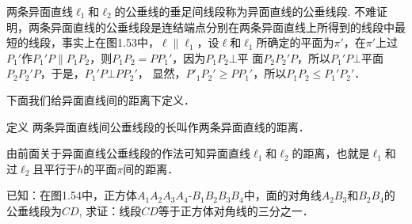   两条异面直线$\ell_1$和$\ell_2$的公垂线的垂足间线段称为异面直线的公垂线段. 不难证明，两条异面直线的公垂线段是连结端点分别在两条异面直线上所得到的线段中最短的线段，事实上在图1.53中，$\ell\parallel \ell_1$，设$\ell$和$\ell_1$所确定的平面为$\pi'$，在$\pi'$上过$P_1'$作$P_1'P\parallel P_1P_2$，则$P_1P_2=PP_1'$，因为$P_1P_2\bot $平
  面$P_2P_2'P$，所以$P_1'P\bot $平面$P_2P_2'P$，于是，$P_1'P\bot PP_2'$，
  显然，$P'_1P_2'\ge PP_1'$，所以$P_1P_2\le P_1'P_2'$．
  
    
  

下面我们给异面直线间的距离下定义．

\begin{blk}
  {定义} 两条异面直线间公垂线段的长叫作两条异面直线的距离．
\end{blk}


由前面关于异面直线公垂线段的作法可知异面直线$\ell_1$和$\ell_2$的距离，也就是$\ell_1$和过$\ell_2$且平行于$h$的平面$\pi$间的距离．

\begin{example}
  已知：在图1.54中，正方体$A_1A_2A_3A_4$-$B_1B_2B_3B_4$中，面的对角线$A_2B_3$和$B_2B_4$的公垂线段为$CD$, 求证：线段$CD$等于正方体对角线的三分之一．
\end{example}

\begin{figure}[htp]
  \centering
{}
  \caption{}
\end{figure}

